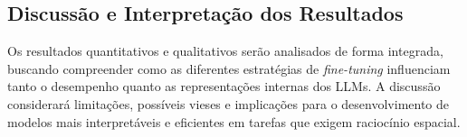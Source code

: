 \subsection{Discussão e Interpretação dos Resultados}

Os resultados quantitativos e qualitativos serão analisados de forma integrada, buscando compreender como as diferentes estratégias de \textit{fine-tuning} influenciam tanto o desempenho quanto as representações internas dos LLMs. A discussão considerará limitações, possíveis vieses e implicações para o desenvolvimento de modelos mais interpretáveis e eficientes em tarefas que exigem raciocínio espacial.
